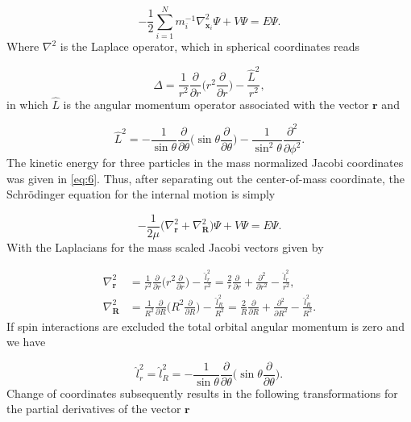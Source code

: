 \documentclass{article}
\numberwithin{equation}{section}
\numberwithin{figure}{section}
\begin{document}
\begin{equation}
-\frac{1}{2} \sum_{i=1}^{N} m^{-1}_{i} \nabla^{2}_{\mathbf{x}_{i}} \Psi + V\Psi = E \Psi. 
\end{equation}
Where $\nabla^{2}$ is the Laplace operator, which in spherical coordinates reads

\begin{equation}
\Delta = \frac{1}{r^{2}}\frac{\partial}{\partial r} \bigg(r^{2} \frac{\partial}{\partial r}\bigg) - \frac{\hat{L}^{2}}{r^{2}},
\end{equation}
in which $\hat{L}$ is the angular momentum operator associated with the vector $\mathbf{r}$ and

\begin{equation}
\hat{L}^{2} = -\frac{1}{\sin{\theta}}\frac{\partial}{\partial \theta} \bigg(\sin{\theta}\frac{\partial}{\partial \theta}\bigg) - \frac{1}{\sin^{2}{\theta}} \frac{\partial^{2}}{\partial \phi^{2}}.
\end{equation}
The kinetic energy for three particles in the mass normalized Jacobi coordinates was given in \eqref{eq:6}. Thus, after separating out the center-of-mass coordinate, the Schr{\"o}dinger equation for the internal motion is simply 

\begin{equation}
-\frac{1}{2\mu} \bigg(\nabla^{2}_{\mathbf{r}} + \nabla^{2}_{\mathbf{R}}\bigg) \Psi + V\Psi = E \Psi. 
\end{equation}
With the Laplacians for the mass scaled Jacobi vectors given by

\begin{align}
	\nabla^2_{\mathbf{r}} &= \frac{1}{r^2}\frac{\partial}{\partial r} \bigg( r^2 \frac{\partial}{\partial r} \bigg) - \frac{\hat{l}^2_{r}}{r^2} = \frac{2}{r}\frac{\partial}{\partial r} + \frac{\partial^2}{\partial r^{2}} - \frac{\hat{l}^{2}_{r}}{r^2},\\
	\nabla^2_{\mathbf{R}} &= \frac{1}{R^2}\frac{\partial}{\partial R} \bigg( R^2 \frac{\partial}{\partial R} \bigg) - \frac{\hat{l}^2_{R}}{R^2} = \frac{2}{R}\frac{\partial}{\partial R} + \frac{\partial^2}{\partial R^{2}} - \frac{\hat{l}^{2}_{R}}{R^2}.
\end{align}
If spin interactions are excluded the total orbital angular momentum is zero and we have 

\begin{equation}
\hat{l}^{2}_r = \hat{l}^{2}_{R} = -\frac{1}{\sin{\theta}} \frac{\partial}{\partial{\theta}} \bigg( \sin{\theta} \frac{\partial}{\partial{\theta}} \bigg).
\end{equation}
Change of coordinates subsequently results in the following transformations for the partial derivatives of the vector $\mathbf{r}$
\end{document}
